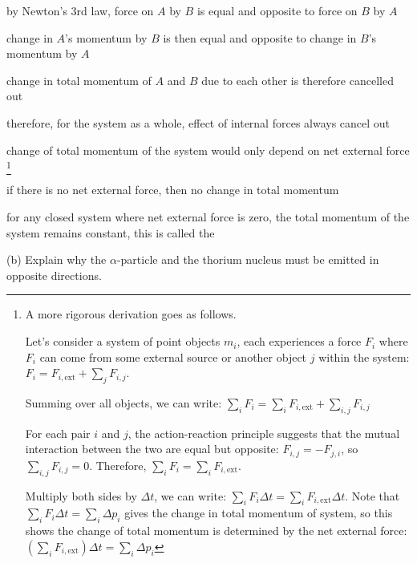 by Newton's 3rd law, force on $A$ by $B$ is equal and opposite to force on $B$ by $A$

change in $A$'s momentum by $B$ is then equal and opposite to change in $B$'s momentum by $A$

change in total momentum of $A$ and $B$ due to each other is therefore cancelled out

therefore, for the system as a whole, effect of internal forces always cancel out

change of total momentum of the system would only depend on net external force
\footnote{A more rigorous derivation goes as follows.
	
	Let's consider a system of point objects $m_i$, each experiences a force $F_i$ where $F_i$ can come from some external source or another object $j$ within the system: $F_i = F_{i,\text{ext}} + \sum_j F_{i,j}$.
	
	Summing over all objects, we can write: $\sum_i F_i = \sum_i F_{i,\text{ext}} + \sum_{i,j} F_{i,j}$ 
	
	For each pair $i$ and $j$, the action-reaction principle suggests that the mutual interaction between the two are equal but opposite: $F_{i,j} = -F_{j,i}$, so $\sum_{i,j} F_{i,j} = 0$. Therefore, $\sum_i F_i = \sum_i F_{i,\text{ext}}$.
	
	Multiply both sides by $\Delta t$, we can write: $\sum_i F_i \Delta t = \sum_i F_{i,\text{ext}} \Delta t$. Note that $\sum_i F_i \Delta t = \sum_i \Delta p_i$ gives the change in total momentum of system, so this shows the change of total momentum is determined by the net external force: $ \boxed{\left(\sum_i F_{i,\text{ext}} \right)\Delta t = \sum_i \Delta p_i}$}


if there is no net external force, then no change in total momentum

\begin{ilight}
	for any closed system where net external force is zero, the total momentum of the system remains constant, this is called the  
\end{ilight}

 (b) Explain why the $\alpha$-particle and the thorium nucleus must be emitted in opposite directions.

